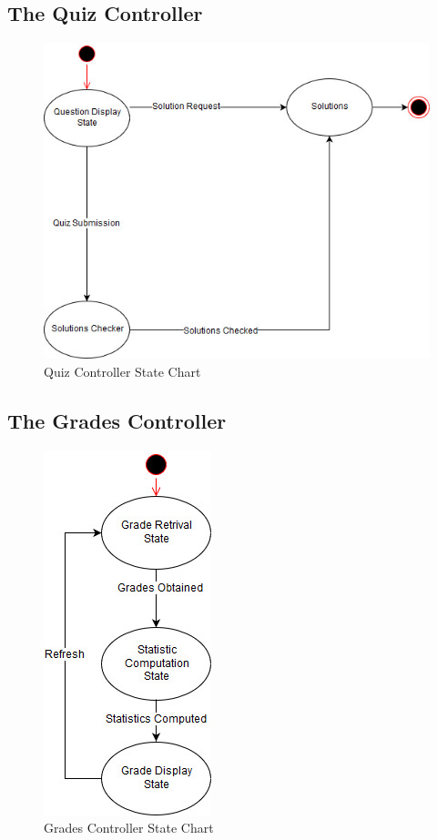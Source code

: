 \documentclass[]{article}
\begin{document}
\subsection{The Quiz Controller}
{
\begin{figure}[H]
  \centering
  \includegraphics[scale=0.5]{A3_Assets/QuizController.jpg}
  \caption{Quiz Controller State Chart}
\end{figure}
}

\subsection{The Grades Controller}
{
\begin{figure}[H]
  \centering
  \includegraphics[scale=0.5]{A3_Assets/GradeController.jpg}
  \caption{Grades Controller State Chart}
\end{figure}
}
\end{document}
